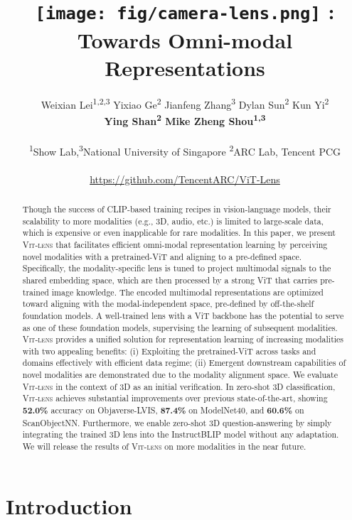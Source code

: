 \documentclass{article}
\title{\texttt{[image: fig/camera-lens.png]}
\methodname: Towards Omni-modal Representations}
\author{Weixian Lei\textsuperscript{\rm 1,2,3}\quad
     Yixiao Ge\textsuperscript{\rm 2}\textsuperscript{\dag}\quad
     Jianfeng Zhang\textsuperscript{\rm 3}\quad
     Dylan Sun\textsuperscript{\rm 2}\quad
     Kun Yi\textsuperscript{\rm 2}\quad \\
     \textbf{Ying Shan\textsuperscript{\rm 2}\quad
     Mike Zheng Shou\textsuperscript{\rm 1,3}\textsuperscript{\dag}} \\~\\ 
    \textsuperscript{\rm 1}Show Lab,\textsuperscript{\rm 3}National University of Singapore \quad
    \textsuperscript{\rm 2}ARC Lab, Tencent PCG  \\~\\
    \url{https://github.com/TencentARC/ViT-Lens}
}
\newcommand{\ptvit}{pretrained-ViT\xspace}
\newcommand{\methodname}{{\scshape Vit-lens}\xspace}
\begin{document}
\maketitle
\renewcommand{\thefootnote}{\dag}
\renewcommand{\thefootnote}{\alph{footnote}}

\begin{abstract} 
Though the success of CLIP-based training recipes in vision-language models, their scalability to more modalities (e.g., 3D, audio, etc.) is limited to large-scale data, which is expensive or even inapplicable for rare modalities.
In this paper, we present \methodname that facilitates efficient omni-modal representation learning by perceiving novel modalities with a \ptvit and aligning to a pre-defined space.
Specifically, the modality-specific lens is tuned to project multimodal signals to the shared embedding space, which are then processed by a strong ViT that carries pre-trained image knowledge.
The encoded multimodal representations are optimized toward aligning with the modal-independent space, pre-defined by off-the-shelf foundation models. A well-trained lens with a ViT backbone has the potential to serve as one of these foundation models, supervising the learning of subsequent modalities.
\methodname provides a unified solution for representation learning of increasing modalities with two appealing benefits:
(i) Exploiting the \ptvit across tasks and domains effectively with efficient data regime;
(ii) Emergent downstream capabilities of novel modalities are demonstrated due to the modality alignment space.
We evaluate \methodname in the context of 3D as an initial verification.
In zero-shot 3D classification, \methodname achieves substantial improvements over previous state-of-the-art, showing \textbf{52.0\%} accuracy on Objaverse-LVIS, \textbf{87.4\%} on ModelNet40, and \textbf{60.6\%} on ScanObjectNN. 
Furthermore, we enable zero-shot 3D question-answering by simply integrating the trained 3D lens into the InstructBLIP model without any adaptation.
We will release the results of \methodname on more modalities in the near future.


\end{abstract}


\section{Introduction}
\end{document}

